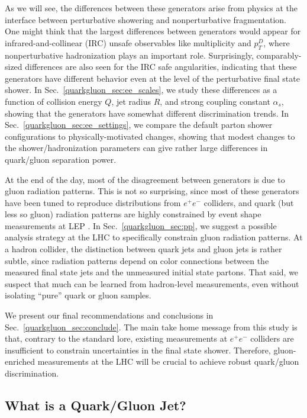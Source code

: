 \documentclass[11pt]{cernrep}
\begin{document}
As we will see, the differences between these generators arise from
physics at the interface between perturbative showering and
nonperturbative fragmentation.  One might think that the largest
differences between generators would appear for infrared-and-collinear
(IRC) unsafe observables like multiplicity and $p_T^D$, where
nonperturbative hadronization plays an important role.  Surprisingly, comparably-sized differences are also
seen for the IRC safe angularities, indicating that these generators
have different behavior even at the level of the perturbative final
state shower.  In Sec.~\ref{quarkgluon_sec:ee_scales}, we study these
differences as a function of collision energy $Q$, jet radius $R$,
and strong coupling constant $\alpha_s$, showing that the generators
have somewhat different discrimination trends.  In
Sec.~\ref{quarkgluon_sec:ee_settings}, we compare the default parton
shower configurations to physically-motivated changes, showing that
modest changes to the shower/hadronization parameters can give rather
large differences in quark/gluon separation power.

At the end of the day, most of the disagreement between generators is due to gluon radiation patterns.  This is not so surprising, since most of these generators have been tuned to reproduce distributions from $e^+ e^-$ colliders, and quark (but less so gluon) radiation patterns are highly constrained by event shape measurements at LEP \cite{Heister:2003aj,Abdallah:2003xz,Achard:2004sv,Abbiendi:2004qz}.  In Sec.~\ref{quarkgluon_sec:pp}, we suggest a possible analysis strategy at the LHC to specifically constrain gluon radiation patterns.  At a hadron collider, the distinction between quark jets and gluon jets is rather subtle, since radiation patterns depend on color connections between the measured final state jets and the unmeasured initial state partons.  That said, we suspect that much can be learned from hadron-level measurements, even without isolating ``pure'' quark or gluon samples.

We present our final recommendations and conclusions in
Sec.~\ref{quarkgluon_sec:conclude}.  The main take home message from
this study is that, contrary to the standard lore, existing
measurements at $e^+e^-$ colliders are insufficient to constrain
uncertainties in the final state shower.  Therefore, gluon-enriched
measurements at the LHC will be crucial to achieve robust quark/gluon
discrimination.

\subsection{What is a Quark/Gluon Jet?}
\label{quarkgluon_sec:def}
\end{document}
